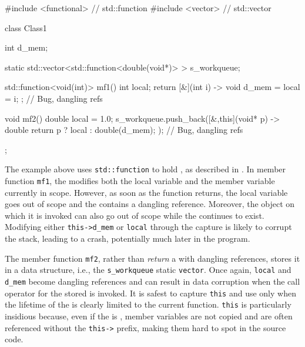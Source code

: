 \begin{emcppslisting}
#include <functional>  // std::function
#include <vector>      // std::vector

class Class1
{
    int d_mem;

    static std::vector<std::function<double(void*)> > s_workqueue;

    std::function<void(int)> mf1()
    {
        int local;
        return [&](int i) -> void { d_mem = local = i; };  // Bug, dangling refs
    }

    void mf2()
    {
        double local = 1.0;
        s_workqueue.push_back([&,this](void* p) -> double {
                return p ? local : double(d_mem);
            });  // Bug, dangling refs
    }
};
\end{emcppslisting}


\noindent The example above uses \lstinline!std::function! to hold , as described in . In member
function \lstinline!mf1!, the  modifies both the local
variable and the member variable currently in scope. However, as soon as
the function returns, the local variable goes out of scope and the
 contains a dangling reference. Moreover, the object on
which it is invoked can also go out of scope while the  continues to exist. Modifying either \lstinline!this->d_mem! or
\lstinline!local! through the capture is likely to corrupt the stack,
leading to a crash, potentially much later in the program.

The member function \lstinline!mf2!, rather than \emph{return} a
 with dangling references, stores it in a data
structure, i.e., the \lstinline!s_workqueue! static \lstinline!vector!. Once
again, \lstinline!local! and \lstinline!d_mem! become dangling references and
can result in data corruption when the call operator for the stored
 is invoked. It is safest to capture
\lstinline!this! and use  only when the
lifetime of the  is clearly limited to the
current function.  \lstinline!this! is
particularly insidious because, even if the  is
, member variables are not copied and are often
referenced without the \lstinline!this->! prefix, making them hard to spot
in the source code.

